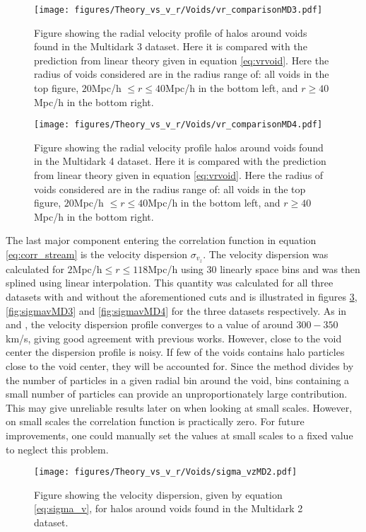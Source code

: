 \begin{figure}[H]
    \texttt{[image: figures/Theory\_vs\_v\_r/Voids/vr\_comparisonMD3.pdf]}
    \caption{Figure showing the radial velocity profile of halos around voids found in the Multidark 3 dataset. Here it is compared with the prediction from linear theory given in equation \ref{eq:vrvoid}. Here the radius of voids considered are in the radius range of: all voids in the top figure, $20$Mpc/h $\leq r\leq 40$Mpc/h in the bottom left, and $r\geq 40$Mpc/h in the bottom right.}
    \label{fig:vrMD3}
\end{figure}

\begin{figure}[H]
    \texttt{[image: figures/Theory\_vs\_v\_r/Voids/vr\_comparisonMD4.pdf]}
    \caption{Figure showing the radial velocity profile halos around voids found in the Multidark 4 dataset. Here it is compared with the prediction from linear theory given in equation \ref{eq:vrvoid}. Here the radius of voids considered are in the radius range of: all voids in the top figure, $20$Mpc/h $\leq r\leq 40$Mpc/h in the bottom left, and $r\geq 40$Mpc/h in the bottom right.}
    \label{fig:vrMD4}
\end{figure}
The last major component entering the correlation function in equation \ref{eq:corr_stream} is the velocity dispersion $\sigma_{v_z}$. The velocity dispersion was calculated for $2$Mpc/h$\leq r\leq 118$Mpc/h using $30$ linearly space bins and was then splined using linear interpolation. This quantity was calculated for all three datasets with and without the aforementioned cuts and is illustrated in figures \ref{fig:sigmavMD2}, \ref{fig:sigmavMD3} and \ref{fig:sigmavMD4} for the three datasets respectively. As in \cite{Nadathur_corr} and \cite{Achitouv_streaming}, the velocity dispersion profile converges to a value of around $300-350$ km/s, giving good agreement with previous works. However, close to the void center the dispersion profile is noisy. If few of the voids contains halo particles close to the void center, they will be accounted for. Since the method divides by the number of particles in a given radial bin around the void, bins containing a small number of particles can provide an unproportionately large contribution. This may give unreliable results later on when looking at small scales. However, on small scales the correlation function is practically zero. For future improvements, one could manually set the values at small scales to a fixed value to neglect this problem.
\begin{figure}[H]
    \texttt{[image: figures/Theory\_vs\_v\_r/Voids/sigma\_vzMD2.pdf]}
    \caption{Figure showing the velocity dispersion, given by equation \ref{eq:sigma_v}, for halos around voids found in the Multidark 2 dataset.}
    \label{fig:sigmavMD2}
\end{figure}


